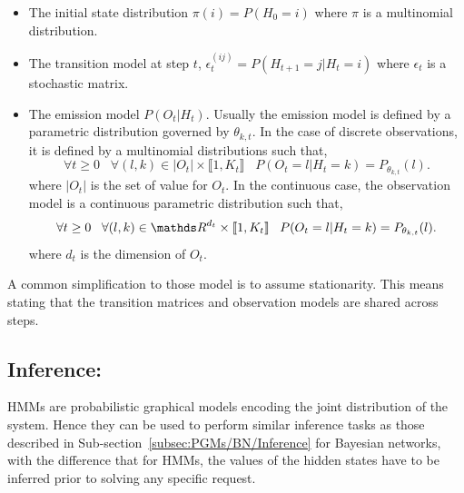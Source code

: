 \documentclass[a4paper,11pt]{report}
\begin{document}
      \begin{itemize}
        \item The initial state distribution $\pi(i) = P(H_{0} = i)$ where $\pi$ is a multinomial distribution.\\
        \item The transition model at step $t$, $\epsilon_{t}^{(ij)} = P(H_{t+1} = j | H_{t} = i)$ where $\epsilon_{t}$ is a stochastic matrix.\\
        \item The emission model $P(O_{t}|H_{t})$. Usually the emission model is defined by a parametric distribution governed by $\theta_{k,t}$. In the case of discrete observations,  it is defined by a multinomial distributions such that,
					\begin{equation*}
						\forall t \geq 0 \;\;\; \forall (l,k) \in |O_{t}| \times \llbracket 1, K_{t} \rrbracket \;\;\;
						P(O_{t}= l| H_{t}=k) = P_{\theta_{k,t}}(l).
					\end{equation*}
					where $|O_{t}|$ is the set of value for $O_{t}$. In the continuous case, the observation model is a continuous parametric distribution such that,
					\begin{equation*}
						\forall t \geq 0 \;\;\; \forall (l,k) \in \dsR^{d_{t}} \times \llbracket 1, K_{t} \rrbracket \;\;\;
						P(O_{t}= l| H_{t}=k) = P_{\theta_{k,t}}(l).
					\end{equation*}
					where $d_{t}$ is the dimension of $O_{t}$.\\
					
      \end{itemize}

      A common simplification to those model is to assume stationarity. This means stating that the transition matrices and observation models are shared across steps. 
      
    \subsection{Inference:}
      \label{subsec:PGMs/MM/Inference}
      
      HMMs are probabilistic graphical models encoding the joint distribution of the system. Hence they can be used to perform similar inference tasks as those described in Sub-section~\ref{subsec:PGMs/BN/Inference} for Bayesian networks, with the difference that for HMMs, the values of the hidden states have to be inferred prior to solving any specific request.\\
      
\end{document}
